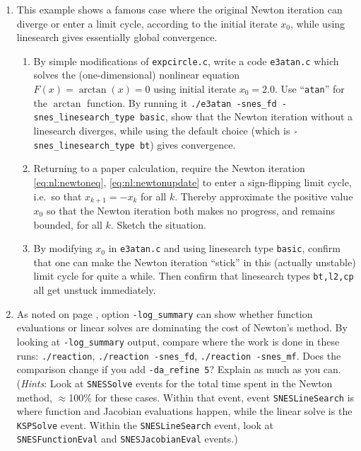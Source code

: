 \begin{enumerate}
\item  \label{exer:newtonatan}
This example shows a famous case where the original Newton iteration can diverge or enter a limit cycle, according to the initial iterate $x_0$, while using linesearch gives essentially global convergence.
    \begin{enumerate}
    \item By simple modifications of \texttt{expcircle.c}, write a code \texttt{e3atan.c} which solves the (one-dimensional) nonlinear equation $F(x)=\arctan(x)=0$ using initial iterate $x_0=2.0$.  Use ``\texttt{atan}'' for the $\arctan$ function.  By running it \texttt{./e3atan -snes\_fd -snes\_linesearch\_type basic}, show that the Newton iteration without a linesearch diverges, while using the default choice (which is \texttt{-snes\_linesearch\_type bt}) gives convergence.
    \item Returning to a paper calculation, require the Newton iteration \eqref{eq:nl:newtoneq}, \eqref{eq:nl:newtonupdate} to enter a sign-flipping limit cycle, i.e.~so that $x_{k+1} = - x_k$ for all $k$.  Thereby approximate the positive value $x_0$ so that the Newton iteration both makes no progress, and remains bounded, for all $k$.  Sketch the situation.
    \item By modifying $x_0$ in \texttt{e3atan.c} and using linesearch type \texttt{basic}, confirm that one can make the Newton iteration ``stick'' in this (actually unstable) limit cycle for quite a while.  Then confirm that linesearch types \texttt{bt,l2,cp} all get unstuck immediately.
    \end{enumerate}

\item As noted on page \pageref{sidenote:logsummary}, \PETSc option \texttt{-log\_summary} can show whether function evaluations or linear solves are dominating the cost of Newton's method.  By looking at \texttt{-log\_summary} output, compare where the work is done in these runs: \texttt{./reaction}, \texttt{./reaction -snes\_fd}, \texttt{./reaction -snes\_mf}.  Does the comparison change if you add \texttt{-da\_refine 5}?  Explain as much as you can.  (\emph{Hints}: Look at \texttt{SNESSolve} events for the total time spent in the Newton method, $\approx$100\% for these cases.  Within that event, event \texttt{SNESLineSearch} is where function and Jacobian evaluations happen, while the linear solve is the \texttt{KSPSolve} event.  Within the \texttt{SNESLineSearch} event, look at \texttt{SNESFunctionEval} and \texttt{SNESJacobianEval} events.)


\end{enumerate}
